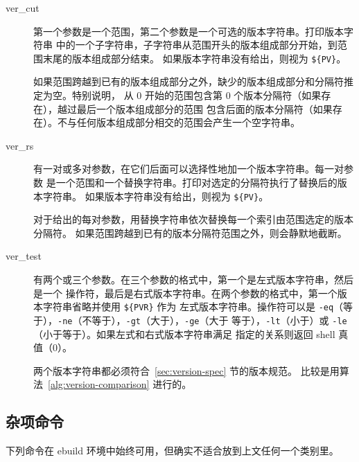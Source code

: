 \begin{description}
\item[ver_cut] 第一个参数是一个范围，第二个参数是一个可选的版本字符串。打印版本字符串
    中的一个子字符串，子字符串从范围开头的版本组成部分开始，到范围末尾的版本组成部分结束。
    如果版本字符串没有给出，则视为 \texttt{\$\{PV\}}。

    如果范围跨越到已有的版本组成部分之外，缺少的版本组成部分和分隔符推定为空。特别说明，
    从 0 开始的范围包含第 0 个版本分隔符（如果存在），越过最后一个版本组成部分的范围
    包含后面的版本分隔符（如果存在）。不与任何版本组成部分相交的范围会产生一个空字符串。

\item[ver_rs] 有一对或多对参数，在它们后面可以选择性地加一个版本字符串。每一对参数
    是一个范围和一个替换字符串。打印对选定的分隔符执行了替换后的版本字符串。
    如果版本字符串没有给出，则视为 \texttt{\$\{PV\}}。

    对于给出的每对参数，用替换字符串依次替换每一个索引由范围选定的版本分隔符。
    如果范围跨越到已有的版本分隔符范围之外，则会静默地截断。

\item[ver_test] 有两个或三个参数。在三个参数的格式中，第一个是左式版本字符串，然后是一个
    操作符，最后是右式版本字符串。在两个参数的格式中，第一个版本字符串省略并使用 \texttt{\$\{PVR\}} 作为
    左式版本字符串。操作符可以是 \texttt{-eq}（等于），\texttt{-ne}（不等于），\texttt{-gt}（大于），\texttt{-ge}（大于
    等于），\texttt{-lt}（小于）或 \texttt{-le}（小于等于）。如果左式和右式版本字符串满足
    指定的关系则返回 shell 真值（0）。

    两个版本字符串都必须符合~\ref{sec:version-spec} 节的版本规范。
    比较是用算法~\ref{alg:version-comparison} 进行的。
\end{description}

\subsection{杂项命令}
下列命令在 ebuild 环境中始终可用，但确实不适合放到上文任何一个类别里。

